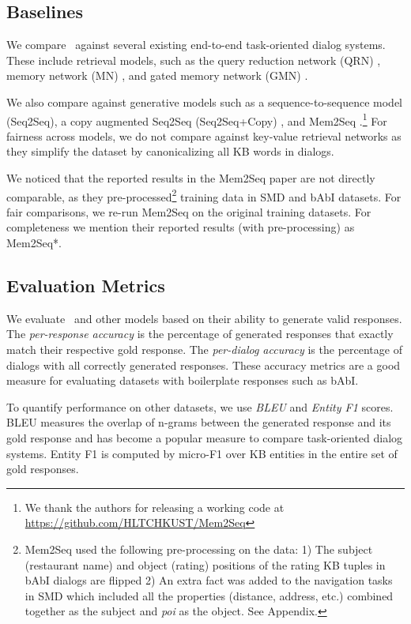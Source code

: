 \subsection{Baselines}
We compare \sys\ against several existing end-to-end task-oriented dialog systems. These include retrieval models, such as the query reduction network (QRN) \cite{seo2016query}, memory network (MN) \cite{BordesW16}, and gated memory network (GMN) \cite{liu2017gated}. 

We also compare against generative models such as a sequence-to-sequence model (Seq2Seq), a copy augmented Seq2Seq (Seq2Seq+Copy) \cite{ptr-unk}, and Mem2Seq \cite{mem2seq}.\footnote{We thank the authors for releasing a working code at \url{https://github.com/HLTCHKUST/Mem2Seq}} For fairness across models, we do not compare against key-value retrieval networks \cite{Ericsigdial} as they simplify the dataset by canonicalizing all KB words in dialogs.

We noticed that the reported results in the Mem2Seq paper are not directly comparable, as they pre-processed\footnote{Mem2Seq used the following pre-processing on the data: 1) The subject (restaurant name) and object (rating) positions of the rating KB tuples in bAbI dialogs are flipped 2) An extra fact was added to the navigation tasks in SMD which included all the properties (distance, address, etc.) combined together  as the subject and \textit{poi} as the object. See Appendix.} training data in SMD and bAbI datasets. For fair comparisons, we re-run Mem2Seq on the original training datasets. For completeness we mention their reported results (with pre-processing) as Mem2Seq*.

\subsection{Evaluation Metrics}
We evaluate \sys\ and other models based on their ability to generate valid responses. The {\em per-response accuracy} \cite{BordesW16} is the percentage of generated responses that exactly match their respective gold response. The {\em per-dialog accuracy} is the percentage of dialogs with all correctly generated responses. These accuracy metrics are a good measure for evaluating datasets with boilerplate responses such as bAbI. 

To quantify performance on other datasets, we use {\em BLEU} \cite{papineni2002bleu} and {\em Entity F1} \cite{eric2017copy} scores. BLEU measures the overlap of n-grams between the generated response and its gold response and has become a popular measure to compare task-oriented dialog systems. Entity F1 is computed by micro-F1 over KB entities in the entire set of gold responses. 

